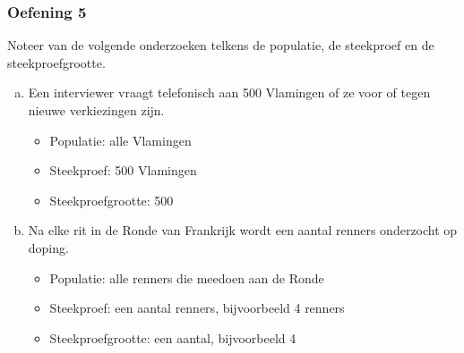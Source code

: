 \documentclass[13pt]{beamer}
\newenvironment{answer}
{\color{blue}}
{\color{black}}
\begin{document}
\begin{frame}
  \frametitle{Oefening 5}
  Noteer van de volgende onderzoeken telkens de populatie, de steekproef en de steekproefgrootte.
  \begin{enumerate}[(a)]
  \item Een interviewer vraagt telefonisch aan 500 Vlamingen of ze voor of tegen nieuwe verkiezingen zijn.
    \begin{itemize}
      \begin{answer}
      \item Populatie: alle Vlamingen
      \item Steekproef: 500 Vlamingen
      \item Steekproefgrootte: 500
      \end{answer}
    \end{itemize}
  \item Na elke rit in de Ronde van Frankrijk wordt een aantal renners onderzocht op doping.
    \begin{itemize}
      \begin{answer}
      \item Populatie: alle renners die meedoen aan de Ronde
      \item Steekproef: een aantal renners, bijvoorbeeld 4 renners
      \item Steekproefgrootte: een aantal, bijvoorbeeld 4
      \end{answer}
    \end{itemize}
  \end{enumerate}
\end{frame}
\end{document}
